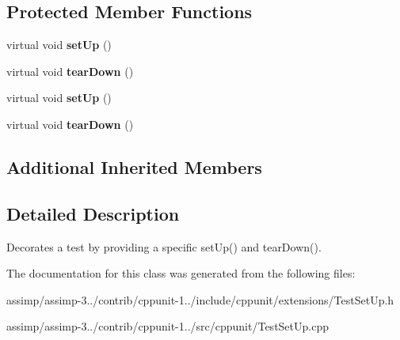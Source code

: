 \subsection*{Protected Member Functions}
\begin{DoxyCompactItemize}
\item 
\hypertarget{class_test_set_up_a56cb6b1d6f60f26ecc0f2599a076447a}{virtual void {\bfseries set\+Up} ()}\label{class_test_set_up_a56cb6b1d6f60f26ecc0f2599a076447a}

\item 
\hypertarget{class_test_set_up_ac40cb31a67ed20223b9ab02619062b07}{virtual void {\bfseries tear\+Down} ()}\label{class_test_set_up_ac40cb31a67ed20223b9ab02619062b07}

\item 
\hypertarget{class_test_set_up_a9b40e24a51084e66a53fce52b4c6314b}{virtual void {\bfseries set\+Up} ()}\label{class_test_set_up_a9b40e24a51084e66a53fce52b4c6314b}

\item 
\hypertarget{class_test_set_up_aa935d1ec432a2d3f1be86c1172b1c028}{virtual void {\bfseries tear\+Down} ()}\label{class_test_set_up_aa935d1ec432a2d3f1be86c1172b1c028}

\end{DoxyCompactItemize}
\subsection*{Additional Inherited Members}


\subsection{Detailed Description}
Decorates a test by providing a specific set\+Up() and tear\+Down(). 

The documentation for this class was generated from the following files\+:\begin{DoxyCompactItemize}
\item 
assimp/assimp-\/3../contrib/cppunit-\/1../include/cppunit/extensions/Test\+Set\+Up.\+h\item 
assimp/assimp-\/3../contrib/cppunit-\/1../src/cppunit/Test\+Set\+Up.\+cpp\end{DoxyCompactItemize}
